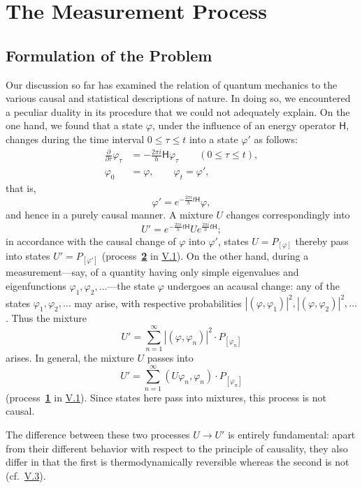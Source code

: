 \documentclass[fontsize=13pt,twoside,openany,headings=normal,parskip=false,bookmarkpackage=false,DIV=calc]{scrbook}
\begin{document}
\chapter{The Measurement Process}\label{chap:VI}
\section{Formulation of the Problem}\label{sec:VI.1}
Our discussion so far has examined the relation of quantum mechanics to the various causal and statistical descriptions of nature. In doing so, we encountered a peculiar duality in its procedure that we could not adequately explain. On the one hand, we found that a state $\varphi$, under the influence of an energy operator $\mathsf H$, changes during the time interval $0\leq\tau\leq t$ into a state $\varphi'$ as follows:
\begin{align*}
 \frac{\partial}{\partial\tau}\varphi_\tau
 &=-\frac{2\pi i}{h}\mathsf H\varphi_\tau\qquad(0\leq\tau\leq t),\\
 \varphi_0&=\varphi,\qquad\varphi_t=\varphi',
\end{align*}
that is,
\[
 \varphi'=e^{-\frac{2\pi i}{h}t\mathsf H}\varphi,
\]
and hence in a purely causal manner. A mixture $U$ changes correspondingly into
\[
 U'=e^{-\frac{2\pi i}{h}t\mathsf H}Ue^{\frac{2\pi i}{h}t\mathsf H};
\]
in accordance with the causal change of $\varphi$ into $\varphi'$, states $U=P_{[\varphi]}$ thereby pass into states $U'=P_{[\varphi']}$ (process~\hyperref[eq:V.1.2]{\textbf{2}} in \hyperref[sec:V.1]{V.1}). On the other hand, during a measurement---say, of a quantity having only simple eigenvalues and eigenfunctions $\varphi_1,\varphi_2,\ldots$---the state $\varphi$ undergoes an acausal change: any of the states $\varphi_1,\varphi_2,\ldots$ may arise, with respective probabilities $|(\varphi,\varphi_1)|^2,|(\varphi,\varphi_2)|^2,\ldots$. Thus the mixture
\[
 U'=\sum_{n=1}^{\infty}|(\varphi,\varphi_n)|^2\cdot P_{[\varphi_n]}
\]
arises. In general, the mixture $U$ passes into
\[
 U'=\sum_{n=1}^{\infty}(U\varphi_n,\varphi_n)\cdot P_{[\varphi_n]}
\]
(process~\hyperref[eq:V.1.1]{\textbf{1}} in \hyperref[sec:V.1]{V.1}). Since states here pass into mixtures, this process is not causal.

The difference between these two processes $U\longrightarrow U'$ is entirely fundamental: apart from their different behavior with respect to the principle of causality, they also differ in that the first is thermodynamically reversible whereas the second is not (cf.\ \hyperref[sec:V.3]{V.3}).
\hypertarget{origpage-223}{}%
\end{document}
